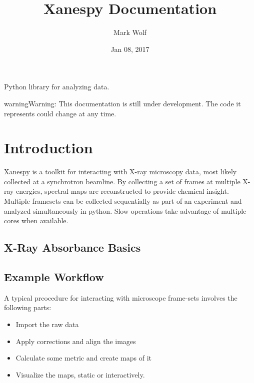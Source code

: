 \documentclass[letterpaper,10pt,english]{sphinxmanual}
\title{Xanespy Documentation}
\date{Jan 08, 2017}
\author{Mark Wolf}
\begin{document}
\maketitle
\sphinxtableofcontents
{}\label{\detokenize{index::doc}}


Python library for analyzing  data.

\begin{sphinxadmonition}{warning}{Warning:}
This documentation is still under development. The code
it represents could change at any time.
\end{sphinxadmonition}


\chapter{Introduction}
\label{\detokenize{intro:introduction}}\label{\detokenize{intro::doc}}\label{\detokenize{intro:xanespy-documentation}}
Xanespy is a toolkit for interacting with X-ray microscopy data, most
likely collected at a synchrotron beamline. By collecting a set of
frames at multiple X-ray energies, spectral maps are reconstructed to
provide chemical insight. Multiple framesets can be collected
sequentially as part of an  experiment and analyzed
simultaneously in python. Slow operations take advantage of multiple
cores when available.


\section{X-Ray Absorbance Basics}
\label{\detokenize{intro:x-ray-absorbance-basics}}

\section{Example Workflow}
\label{\detokenize{intro:example-workflow}}
A typical prcocedure for interacting with microscope frame-sets involves the following parts:
\begin{itemize}
\item {} 
Import the raw data

\item {} 
Apply corrections and align the images

\item {} 
Calculate some metric and create maps of it

\item {} 
Visualize the maps, static or interactively.

\end{itemize}
\end{document}
